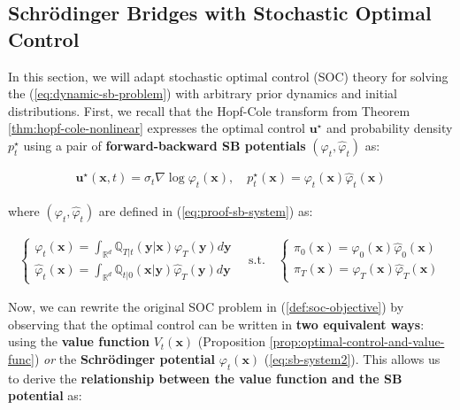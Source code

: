\documentclass{article}
\newcommand{\boldtext}[1]{\textbf{\textcolor{MyGreen}{#1}}}
\begin{document}
\subsection{Schrödinger Bridges with Stochastic Optimal Control}
\label{subsec:sb-soc}
In this section, we will adapt stochastic optimal control (SOC) theory for solving the (\ref{eq:dynamic-sb-problem}) with arbitrary prior dynamics and initial distributions. First, we recall that the Hopf-Cole transform from Theorem \ref{thm:hopf-cole-nonlinear} expresses the optimal control $\boldsymbol{u}^\star$ and probability density $p^\star_t$ using a pair of \boldtext{forward-backward SB potentials} $(\varphi_t, \hat{\varphi}_t)$ as: 
\begin{small}
\begin{align}
    \boldsymbol{u}^\star(\boldsymbol{x},t)=\sigma_t\nabla \log\varphi_t(\boldsymbol{x}), \quad p^\star_t(\boldsymbol{x})=\varphi_t(\boldsymbol{x})\hat{\varphi}_t(\boldsymbol{x})\label{eq:sb-system2}
\end{align}
\end{small}
where $(\varphi_t, \hat{\varphi}_t)$ are defined in (\ref{eq:proof-sb-system}) as:
\begin{small}
\begin{align}
    \begin{cases}
        \varphi_t(\boldsymbol{x})=\int_{\mathbb{R}^d}\mathbb{Q}_{T|t}(\boldsymbol{y}|\boldsymbol{x})\varphi_T(\boldsymbol{y})d\boldsymbol{y}\\
        \hat{\varphi}_t(\boldsymbol{x})=\int_{\mathbb{R}^d}\mathbb{Q}_{t|0}(\boldsymbol{x}|\boldsymbol{y})\hat{\varphi}_T(\boldsymbol{y})d\boldsymbol{y}
    \end{cases}\quad\text{s.t.}\quad
    \begin{cases}
        \pi_0(\boldsymbol{x})=\varphi_0(\boldsymbol{x})\hat{\varphi}_0(\boldsymbol{x})\\
        \pi_T(\boldsymbol{x})=\varphi_T(\boldsymbol{x})\hat{\varphi}_T(\boldsymbol{x})
    \end{cases}\tag{Schrödinger Potentials}\label{eq:sb-system1}
\end{align}
\end{small}
Now, we can rewrite the original SOC problem in (\ref{def:soc-objective}) by observing that the optimal control can be written in \textbf{two equivalent ways}: using the \textbf{value function} $V_t(\boldsymbol{x})$ (Proposition \ref{prop:optimal-control-and-value-func}) \textit{or} the \textbf{Schrödinger potential} $\varphi_t(\boldsymbol{x})$ (\ref{eq:sb-system2}). This allows us to derive the \textbf{relationship between the value function and the SB potential} as:
\end{document}
